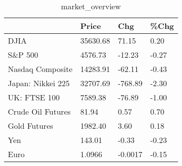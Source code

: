 \documentclass{article}%
\begin{document}
%


\begin{table}[htbp]%
\caption{market\_overview}%
\centering%
\begin{adjustbox}{width=1\textwidth}%
\begin{tabular}{llll}
\toprule
                  &    Price &     Chg &  \%Chg \\
\midrule
             DJIA & 35630.68 &   71.15 &  0.20 \\
          S\&P 500 &  4576.73 &  -12.23 & -0.27 \\
 Nasdaq Composite & 14283.91 &  -62.11 & -0.43 \\
Japan: Nikkei 225 & 32707.69 & -768.89 & -2.30 \\
     UK: FTSE 100 &  7589.38 &  -76.89 & -1.00 \\
Crude Oil Futures &    81.94 &    0.57 &  0.70 \\
     Gold Futures &  1982.40 &    3.60 &  0.18 \\
              Yen &   143.01 &   -0.33 & -0.23 \\
             Euro &   1.0966 & -0.0017 & -0.15 \\
\bottomrule
\end{tabular}
%
\end{adjustbox}%
\end{table}

%
\end{document}
